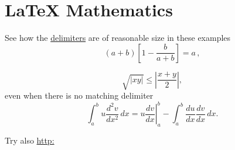 \section{LaTeX Mathematics}
\label{sec:latexmath}
See how the \href{http://del.com}{delimiters} are of reasonable size in these examples
\begin{equation}
\label{eq:del1}
	\left(a+b\right)\left[1-\frac{b}{a+b}\right]=a\,,
\end{equation}

\[
	\sqrt{|xy|}\leq\left|\frac{x+y}{2}\right|,
\]
even when there is no matching delimiter
\[
	\int_a^bu\frac{d^2v}{dx^2}\,dx
	=\left.u\frac{dv}{dx}\right|_a^b
	-\int_a^b\frac{du}{dx}\frac{dv}{dx}\,dx.
\]

Try also \url{http:}